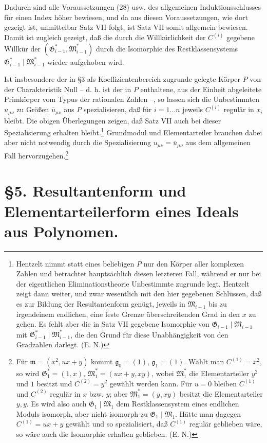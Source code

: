 \documentclass[11pt]{article}
\providecommand{\Gmod}{\mathfrak G}
\providecommand{\Mmod}{\mathfrak M}
\providecommand{\mideal}{\mathfrak m}
\providecommand{\gideal}{\mathfrak g}
\begin{document}
Dadurch sind alle Voraussetzungen (28) usw. des allgemeinen Induktionsschlusses für einen Index höher bewiesen, und da aus diesen Voraussetzungen, wie dort gezeigt ist, unmittelbar Satz VII folgt, ist Satz VII somit allgemein bewiesen. Damit ist zugleich gezeigt, daß die durch die Willkürlichkeit der $C^{(i)}$ gegebene Willkür der $(\Gmod^*_{i-1},\Mmod^*_{i-1})$ durch die Isomorphie des Restklassensystems $\Gmod^*_{i-1}\mid\Mmod^*_{i-1}$ wieder aufgehoben wird.

Ist insbesondere der in \S 3 als Koeffizientenbereich zugrunde gelegte Körper $P$ von der Charakteristik Null -- d. h. ist der in $P$ enthaltene, aus der Einheit abgeleitete Primkörper vom Typus der rationalen Zahlen --, so lassen sich die Unbestimmten $u_{\mu\nu}$ zu Größen $\bar u_{\mu\nu}$ aus $P$ spezialisieren, daß für $i=1\ldots n$ jeweils $C^{(i)}$ regulär in $x_i$ bleibt. Die obigen Überlegungen zeigen, daß Satz VII auch bei dieser Spezialisierung erhalten bleibt.\footnote{Hentzelt nimmt statt eines beliebigen $P$ nur den Körper aller komplexen Zahlen und betrachtet hauptsächlich diesen letzteren Fall, während er nur bei der eigentlichen Eliminationstheorie Unbestimmte zugrunde legt. Hentzelt zeigt dann weiter, und zwar wesentlich mit den hier gegebenen Schlüssen, daß es zur Bildung der Resultantenform genügt, jeweils in $\Mmod_{i-1}$ bis zu irgendeinem endlichen, eine feste Grenze überschreitenden Grad in den $x$ zu gehen. Es fehlt aber die in Satz VII gegebene Isomorphie von $\Gmod_{i-1}\mid\Mmod_{i-1}$ mit $\Gmod^*_{i-1}\mid\Mmod^*_{i-1}$, die den Grund für diese Unabhängigkeit von den Gradzahlen darlegt. (E. N.)} Grundmodul und Elementarteiler brauchen dabei aber nicht notwendig durch die Spezialisierung $u_{\mu\nu}=\bar u_{\mu\nu}$ aus dem allgemeinen Fall hervorzugehen.\footnote{Für $\mideal=(x^2,ux+y)$ kommt $\gideal_0=(1)$, $\gideal_1=(1)$. Wählt man $C^{(1)}=x^2$, so wird $\Gmod_1^*=(1,x)$, $\Mmod_1^*=(ux+y,xy)$, wobei $\Mmod_1^*$ die Elementarteiler $y^2$ und $1$ besitzt und $C^{(2)}=y^2$ gewählt werden kann. Für $u=0$ bleiben $C^{(1)}$ und $C^{(2)}$ regulär in $x$ bzw. $y$; aber $\Mmod_1^*=(y,xy)$ besitzt die Elementarteiler $y,y$. Es wird also auch $\Gmod_1\mid\Mmod_1$ dem Restklassensystem eines endlichen Moduls isomorph, aber nicht isomorph zu $\Gmod_1\mid\Mmod_1$. Hätte man dagegen $C^{(1)}=ux+y$ gewählt und so spezialisiert, daß $C^{(1)}$ regulär geblieben wäre, so wäre auch die Isomorphie erhalten geblieben. (E. N.)}

\section*{\S 5. Resultantenform und Elementarteilerform eines Ideals aus Polynomen.}
\end{document}
